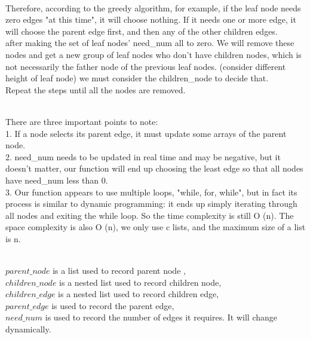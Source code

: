 \documentclass[12pt,a4paper]{article}
\begin{document}
\noindent
\\ Therefore, according to the greedy algorithm, for example, if the leaf node needs zero edges "at this time", it will choose nothing. If it needs one or more edge, it will choose the parent edge first, and then any of the other children edges.
\\ after making the set of leaf nodes' need\_num all to zero. We will remove these nodes and get a new group of leaf nodes who don't have children nodes, which is not necessarily the father node of the previous leaf nodes. (consider different height of leaf node) we must consider the children\_node to decide that.
\\ Repeat the steps until all the nodes are removed.


\noindent
\\There are three important points to note: 
\\1. If a node selects its parent edge, it must update some arrays of the parent node. 
\\2. need\_num needs to be updated in real time and may be negative, but it doesn't matter, our function will end up choosing the least edge so that all nodes have need\_num less than 0.
\\3. Our function appears to use multiple loops, "while, for, while", but in fact its process is similar to dynamic programming: it ends up simply iterating through all nodes and exiting the while loop. So the time complexity is still O (n). The space complexity is also O (n), we only use c lists, and the maximum size of a list is n.


\noindent
\\$parent\_node$ is a list used to record parent node , 
\\$children\_node$ is a nested list used to record children node, 
\\$children\_edge$ is a nested list used to record children edge, 
\\$parent\_edge$ is used to record the parent edge, 
\\$need\_num$ is used to record the number of edges it requires. It will change dynamically.
\end{document}
